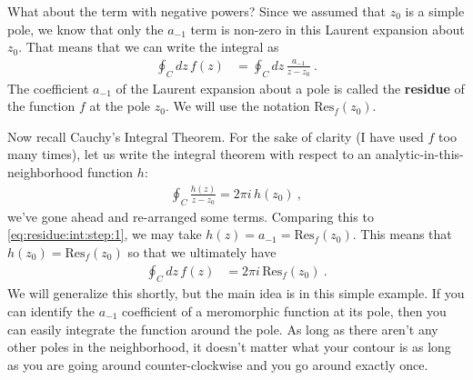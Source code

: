What about the term with negative powers? Since we assumed that $z_0$ is a simple pole, we know that only the $a_{-1}$ term is non-zero in this Laurent expansion about $z_0$. That means that we can write the integral as
\begin{align}
	\oint_C dz\, f(z) &= 
	\oint_C dz \,
	\frac{a_{-1}}{z-z_0} 
	\ .
	\label{eq:residue:int:step:1}
\end{align}
The coefficient $a_{-1}$ of the Laurent expansion about a pole is called the \textbf{residue} of the function $f$ at the pole $z_0$. We will use the notation $\text{Res}_f(z_0)$. 


Now recall Cauchy's Integral Theorem. For the sake of clarity (I have used $f$ too many times), let us write the integral theorem with respect to an analytic-in-this-neighborhood function $h$:
\begin{align}
	\oint_C \frac{h(z)}{z-z_0} = {2\pi i} \, h(z_0) \ ,
\end{align}
we've gone ahead and re-arranged some terms. Comparing this to \eqref{eq:residue:int:step:1}, we may take $h(z) = a_{-1} = \text{Res}_f(z_0)$. This means that $h(z_0) = \text{Res}_f(z_0)$ so that we ultimately have
\begin{align}
	\oint_C dz\, f(z) &=  2\pi i  \, \text{Res}_f(z_0) \ .
\end{align}
We will generalize this shortly, but the main idea is in this simple example. If you can identify the $a_{-1}$ coefficient of a meromorphic function at its pole, then you can easily integrate the function around the pole. As long as there aren't any other poles in the neighborhood, it doesn't matter what your contour is as long as you are going around counter-clockwise and you go around exactly once.









